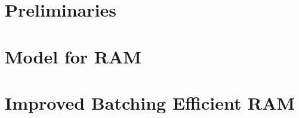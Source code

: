 \documentclass[sigconf]{acmart}
\begin{document}
\section{Preliminaries}\label{sec:prelims}
%    

\section{Model for RAM}\label{sec:model-for-ram}


\section{Improved Batching Efficient RAM}\label{sec:batch-efficient-ram}







\end{document}
